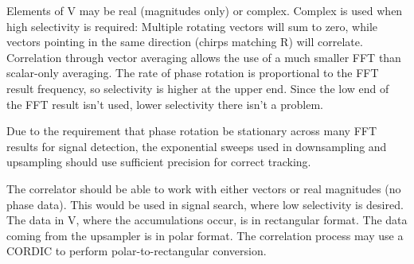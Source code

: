 Elements of V may be real (magnitudes only) or complex.
Complex is used when high selectivity is required:
Multiple rotating vectors will sum to zero, while vectors pointing in the same
direction (chirps matching R) will correlate.
Correlation through vector averaging allows the use of a much smaller FFT than
scalar-only averaging.
The rate of phase rotation is proportional to the FFT result frequency,
so selectivity is higher at the upper end.
Since the low end of the FFT result isn't used,
lower selectivity there isn't a problem.

Due to the requirement that phase rotation be stationary across many FFT results
for signal detection, the exponential sweeps used in downsampling and upsampling
should use sufficient precision for correct tracking.

The correlator should be able to work with either vectors or real magnitudes
(no phase data).
This would be used in signal search, where low selectivity is desired.
The data in V, where the accumulations occur, is in rectangular format.
The data coming from the upsampler is in polar format.
The correlation process may use a CORDIC to perform polar-to-rectangular
conversion.
